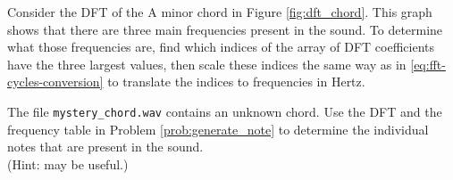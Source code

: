 Consider the DFT of the A minor chord in Figure \ref{fig:dft_chord}.
This graph shows that there are three main frequencies present in the sound.
To determine what those frequencies are, find which indices of the array of DFT coefficients have the three largest values, then scale these indices the same way as in \eqref{eq:fft-cycles-conversion} to translate the indices to frequencies in Hertz.

\begin{problem} %
The file \texttt{mystery\_chord.wav} contains an unknown chord.
Use the DFT and the frequency table in Problem \ref{prob:generate_note} to determine the individual notes that are present in the sound.
\\(Hint:  may be useful.)
\end{problem}

